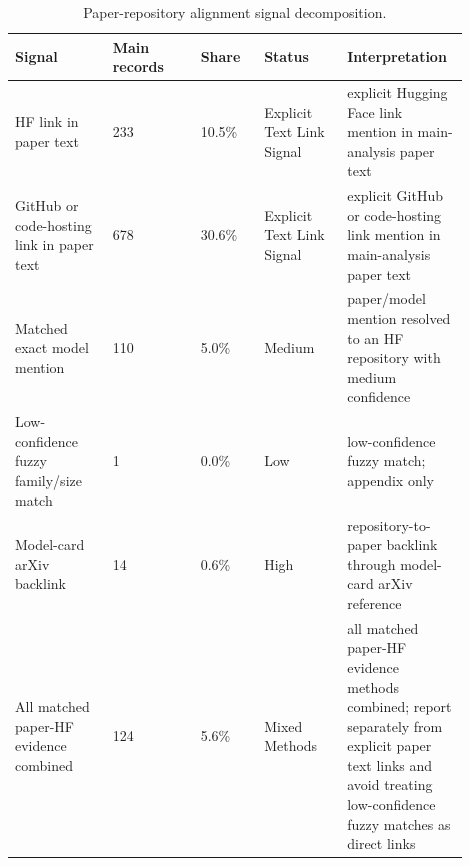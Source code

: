 \begin{table}[t]
\centering
\caption{Paper-repository alignment signal decomposition.}
\label{tab:alignment-decomposition}
\small
\begin{tabular}{p{0.20\linewidth}p{0.18\linewidth}p{0.13\linewidth}p{0.17\linewidth}p{0.22\linewidth}}
\toprule
Signal & Main records & Share & Status & Interpretation \\
\midrule
HF link in paper text & 233 & 10.5\% & Explicit Text Link Signal & explicit Hugging Face link mention in main-analysis paper text \\
GitHub or code-hosting link in paper text & 678 & 30.6\% & Explicit Text Link Signal & explicit GitHub or code-hosting link mention in main-analysis paper text \\
Matched exact model mention & 110 & 5.0\% & Medium & paper/model mention resolved to an HF repository with medium confidence \\
Low-confidence fuzzy family/size match & 1 & 0.0\% & Low & low-confidence fuzzy match; appendix only \\
Model-card arXiv backlink & 14 & 0.6\% & High & repository-to-paper backlink through model-card arXiv reference \\
All matched paper-HF evidence combined & 124 & 5.6\% & Mixed Methods & all matched paper-HF evidence methods combined; report separately from explicit paper text links and avoid treating low-confidence fuzzy matches as direct links \\
\bottomrule
\end{tabular}
\end{table}
